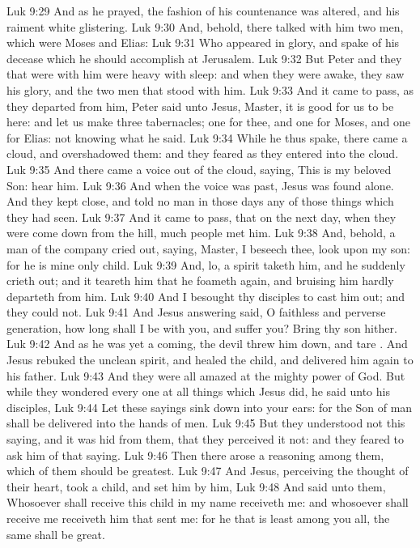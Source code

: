 \vs Luk 9:29 And as he prayed, the fashion of his countenance was altered, and his raiment  white  glistering.
\vs Luk 9:30 And, behold, there talked with him two men, which were Moses and Elias:
\vs Luk 9:31 Who appeared in glory, and spake of his decease which he should accomplish at Jerusalem.
\vs Luk 9:32 But Peter and they that were with him were heavy with sleep: and when they were awake, they saw his glory, and the two men that stood with him.
\vs Luk 9:33 And it came to pass, as they departed from him, Peter said unto Jesus, Master, it is good for us to be here: and let us make three tabernacles; one for thee, and one for Moses, and one for Elias: not knowing what he said.
\vs Luk 9:34 While he thus spake, there came a cloud, and overshadowed them: and they feared as they entered into the cloud.
\vs Luk 9:35 And there came a voice out of the cloud, saying, This is my beloved Son: hear him.
\vs Luk 9:36 And when the voice was past, Jesus was found alone. And they kept  close, and told no man in those days any of those things which they had seen.
\vs Luk 9:37 And it came to pass, that on the next day, when they were come down from the hill, much people met him.
\vs Luk 9:38 And, behold, a man of the company cried out, saying, Master, I beseech thee, look upon my son: for he is mine only child.
\vs Luk 9:39 And, lo, a spirit taketh him, and he suddenly crieth out; and it teareth him that he foameth again, and bruising him hardly departeth from him.
\vs Luk 9:40 And I besought thy disciples to cast him out; and they could not.
\vs Luk 9:41 And Jesus answering said, O faithless and perverse generation, how long shall I be with you, and suffer you? Bring thy son hither.
\vs Luk 9:42 And as he was yet a coming, the devil threw him down, and tare . And Jesus rebuked the unclean spirit, and healed the child, and delivered him again to his father.
\vs Luk 9:43 And they were all amazed at the mighty power of God. But while they wondered every one at all things which Jesus did, he said unto his disciples,
\vs Luk 9:44 Let these sayings sink down into your ears: for the Son of man shall be delivered into the hands of men.
\vs Luk 9:45 But they understood not this saying, and it was hid from them, that they perceived it not: and they feared to ask him of that saying.
\vs Luk 9:46 Then there arose a reasoning among them, which of them should be greatest.
\vs Luk 9:47 And Jesus, perceiving the thought of their heart, took a child, and set him by him,
\vs Luk 9:48 And said unto them, Whosoever shall receive this child in my name receiveth me: and whosoever shall receive me receiveth him that sent me: for he that is least among you all, the same shall be great.

